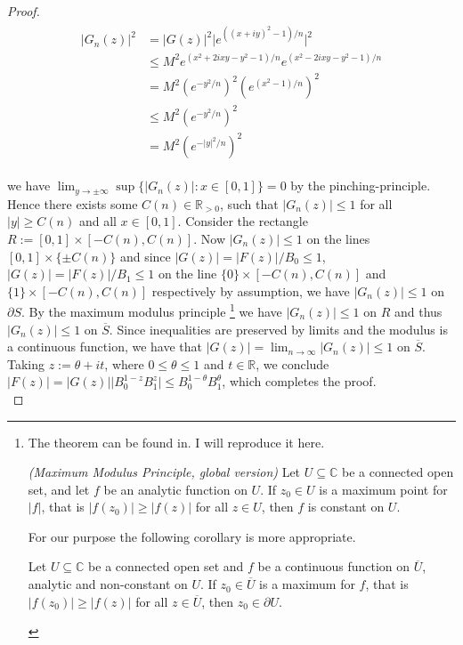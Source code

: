 \begin{proof}
					\begin{gather}
						\begin{aligned}
						\vert G_n(z)\vert^2 &= \vert G(z) \vert^2 \vert e^{((x + iy)^2 - 1)/n} \vert^2\\
						& \leqslant M^2 e^{(x^2 + 2ixy -y^2 - 1)/n} e^{(x^2 - 2ixy -y^2 - 1)/n}\\
						&= M^2 \left( e^{-y^2/n} \right)^2 \left(e^{(x^2 - 1)/n}\right)^2\\
						&\leqslant M^2 \left(e^{-y^2/n}\right)^2\\
						&= M^2 \left( e^{-\vert y \vert^2/n} \right)^2
						\end{aligned}
					\end{gather}

					we have $\lim_{y \rightarrow \pm \infty}\sup\{\vert G_n(z)\vert : x \in [0,1]\} = 0$ by the pinching-principle. Hence there exists some $C(n) \in \mathbb{R}_{>0}$, such that $\vert G_n(z) \vert \leqslant 1$ for all $\vert y \vert \geqslant C(n)$ and all $x \in [0,1]$. Consider the rectangle $R := [0,1] \times [-C(n),C(n)]$. Now $\vert G_n(z) \vert \leqslant 1$ on the lines $[0,1] \times \{\pm C(n)\}$ and since $\vert G(z) \vert = \vert F(z)\vert/B_0 \leqslant 1$, $\vert G(z) \vert = \vert F(z) \vert/B_1 \leqslant 1$ on the line $\{0\} \times [-C(n),C(n)]$ and $\{1\} \times [-C(n),C(n)]$ respectively by assumption, we have $\vert G_n(z) \vert \leqslant 1$ on $\partial S$. By the maximum modulus principle \footnote{
						The theorem can be found in\cite[91--92]{lang:complex_analysis:1993}. I will reproduce it here.

						\begin{lemma}\emph{(Maximum Modulus Principle, global version)}
							Let $U \subseteq \mathbb{C}$ be a connected open set, and let $f$ be an analytic function on $U$. If $z_0 \in U$ is a maximum point for $\vert f \vert$, that is $\vert f(z_0) \vert \geqslant \vert f(z) \vert$ for all $z \in U$, then $f$ is constant on $U$.
						\end{lemma}

						For our purpose the following corollary is more appropriate.

						\begin{corollary}
							Let $U \subseteq \mathbb{C}$ be a connected open set and $f$ be a continuous function on $\overline{U}$, analytic and non-constant on $U$. If $z_0 \in \overline{U}$ is a maximum for $f$, that is $\vert f(z_0) \vert \geqslant \vert f(z) \vert$ for all $z \in \overline{U}$, then $z_0 \in \partial U$.
						\end{corollary}
					}
					we have $\vert G_n(z) \vert \leqslant 1$ on $R$ and thus $\vert G_n(z) \vert \leqslant 1$ on $\overline{S}$. Since inequalities are preserved by limits and the modulus is a continuous function, we have that $\vert G(z) \vert = \lim_{n \rightarrow \infty} \vert G_n(z) \vert \leqslant 1$ on $\overline{S}$. Taking $z := \theta + it$, where $0 \leqslant \theta \leqslant 1$ and $t \in \mathbb{R}$, we conclude $\vert F(z) \vert = \vert G(z) \vert \vert B_0^{1 - z}B_1^z\vert \leqslant B_0^{1 - \theta} B_1^{\theta}$, which completes the proof.\\
		\end{proof}

